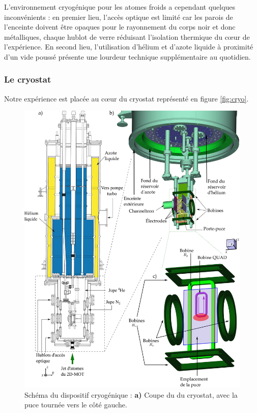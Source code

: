 L'environnement cryogénique pour les atomes froids a cependant quelques inconvénients :
en premier lieu, l'accès optique est limité car les parois de l'enceinte doivent être opaques pour le rayonnement du corps noir et donc métalliques, chaque hublot de verre réduisant l'isolation thermique du c\oe ur de l'expérience.
En second lieu, l'utilisation d'hélium et d'azote liquide à proximité d'un vide poussé présente une lourdeur technique supplémentaire au quotidien.

	\subsubsection*{Le cryostat}
\noindent Notre expérience est placée au c\oe ur du cryostat représenté en figure \eqref{fig:cryo}.
%
\begin{figure}
\centering
\includegraphics[width=\linewidth]{figures/setup/coldatoms/cryo_vect.jpg}
\caption[Schéma du cryostat]{Schéma du dispositif cryogénique :
\textbf{a)} Coupe du du cryostat, avec la puce tournée vers le côté gauche.
}
\end{figure}
